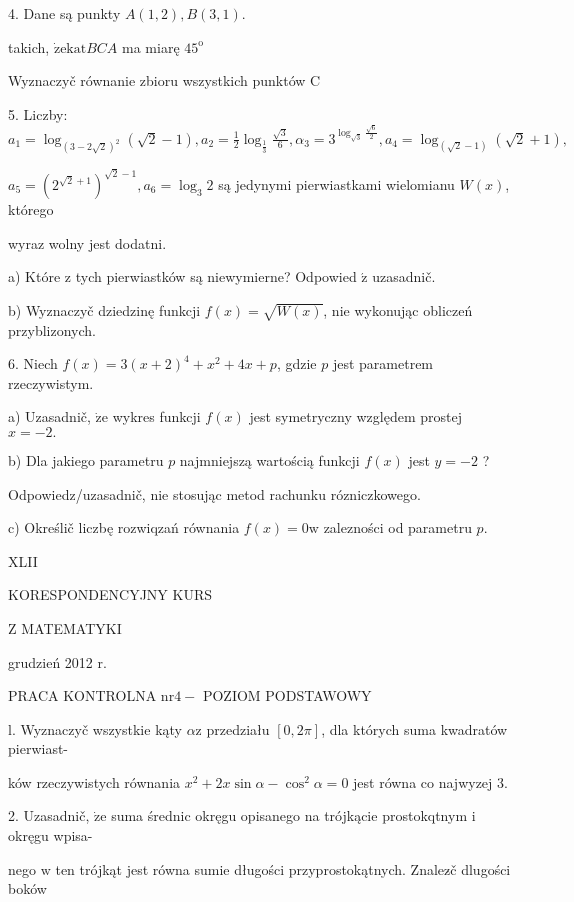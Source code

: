 \documentclass[a4paper,12pt]{article}
\begin{document}
4. Dane są punkty $A(1,2), B(3,1).$

takich, $\dot{\mathrm{z}}\mathrm{e}\mathrm{k}\mathrm{a}\mathrm{t}BCA$ ma miarę $45^{\mathrm{o}}$

Wyznaczyč równanie zbioru wszystkich punktów C

5. Liczby: $a_{1}=\log_{(3-2\sqrt{2})^{2}}(\sqrt{2}-1), a_{2}=\displaystyle \frac{1}{2}\log_{\frac{1}{3}}\frac{\sqrt{3}}{6}, \alpha_{3}=3^{\log_{\sqrt{3}}\frac{\sqrt{6}}{2}}, a_{4}=\log_{(\sqrt{2}-1)}(\sqrt{2}+1),$

$a_{5}=(2^{\sqrt{2}+1})^{\sqrt{2}-1}, a_{6}=\log_{3}2$ są jedynymi pierwiastkami wielomianu $W(x)$, którego

wyraz wolny jest dodatni.

a) Które $\mathrm{z}$ tych pierwiastków są niewymierne? Odpowied $\acute{\mathrm{z}}$ uzasadnič.

b) Wyznaczyč dziedzinę funkcji $f(x)=\sqrt{W(x)}$, nie wykonując obliczeń przyblizonych.

6. Niech $f(x)=3(x+2)^{4}+x^{2}+4x+p$, gdzie $p$ jest parametrem rzeczywistym.

a) Uzasadnič, $\dot{\mathrm{z}}\mathrm{e}$ wykres funkcji $f(x)$ jest symetryczny względem prostej $x=-2.$

b) Dla jakiego parametru $p$ najmniejszą wartością funkcji $f(x)$ jest $y=-2$ ?

Odpowiedz/uzasadnič, nie stosując metod rachunku rózniczkowego.

c) Określič liczbę rozwiqzań równania $f(x)=0\mathrm{w}$ zalezności od parametru $p.$





XLII

KORESPONDENCYJNY KURS

Z MATEMATYKI

grudzień 2012 r.

PRACA KONTROLNA $\mathrm{n}\mathrm{r} 4-$ POZIOM PODSTAWOWY

l. Wyznaczyč wszystkie kąty $\alpha \mathrm{z}$ przedziału $[0,2\pi]$, dla których suma kwadratów pierwiast-

ków rzeczywistych równania $x^{2}+2x\sin\alpha-\cos^{2}\alpha=0$ jest równa co najwyzej 3.

2. Uzasadnič, $\dot{\mathrm{z}}\mathrm{e}$ suma średnic okręgu opisanego na trójkącie prostokqtnym $\mathrm{i}$ okręgu wpisa-

nego $\mathrm{w}$ ten trójkąt jest równa sumie długości przyprostokątnych. Znalez$\acute{}$č dlugości boków
\end{document}
